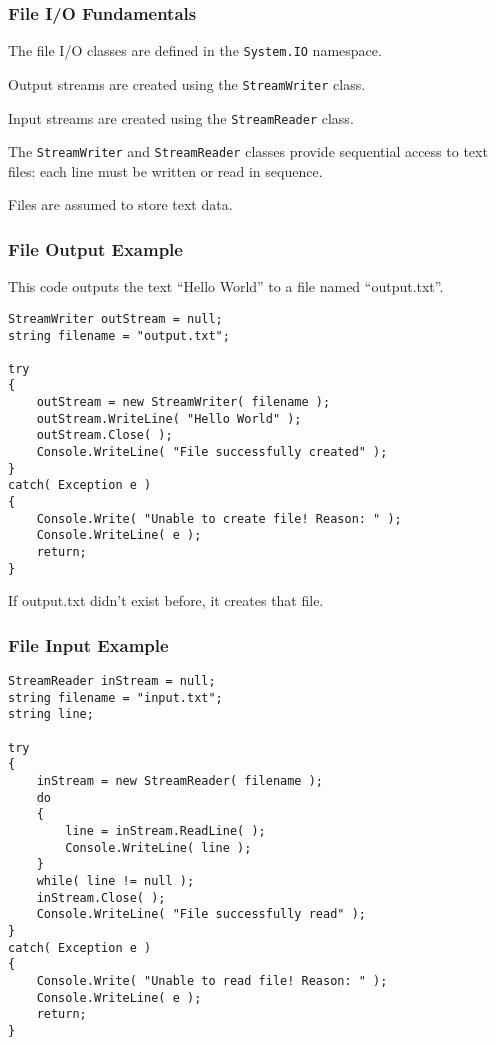 \begin{frame}
\frametitle{File I/O Fundamentals}

The file I/O classes are defined in the \texttt{System.IO} namespace.

Output streams are created using the \texttt{StreamWriter} class.

Input streams are created using the \texttt{StreamReader} class.

The \texttt{StreamWriter} and \texttt{StreamReader} classes provide sequential access to text files: each line must be written or read in sequence.

Files are assumed to store text data.

\end{frame}


\begin{frame}[fragile]
\frametitle{File Output Example}

This code outputs the text ``Hello World'' to a file named ``output.txt''.

{\scriptsize
\begin{verbatim}
StreamWriter outStream = null;
string filename = "output.txt";
           
try
{
    outStream = new StreamWriter( filename );
    outStream.WriteLine( "Hello World" );
    outStream.Close( );
    Console.WriteLine( "File successfully created" );
}
catch( Exception e )
{
    Console.Write( "Unable to create file! Reason: " );
    Console.WriteLine( e );
    return;
}
\end{verbatim}
}

If output.txt didn't exist before, it creates that file.

\end{frame}



\begin{frame}[fragile]
\frametitle{File Input Example}

{\scriptsize
\begin{verbatim}
StreamReader inStream = null;
string filename = "input.txt";
string line;
           
try
{
    inStream = new StreamReader( filename );
    do
    {
        line = inStream.ReadLine( );
        Console.WriteLine( line );
    }
    while( line != null );
    inStream.Close( );
    Console.WriteLine( "File successfully read" );
}
catch( Exception e )
{
    Console.Write( "Unable to read file! Reason: " );
    Console.WriteLine( e );
    return;
}
\end{verbatim}
}

\end{frame}

